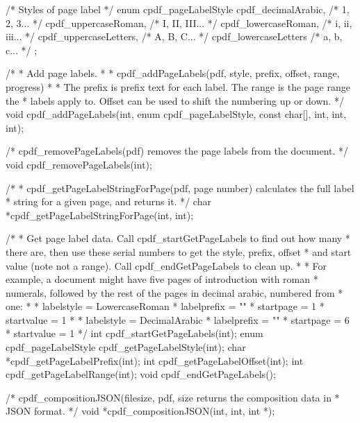 /* Styles of page label */
enum cpdf_pageLabelStyle {
  cpdf_decimalArabic,    /* 1, 2, 3... */
  cpdf_uppercaseRoman,   /* I, II, III... */
  cpdf_lowercaseRoman,   /* i, ii, iii... */
  cpdf_uppercaseLetters, /* A, B, C... */
  cpdf_lowercaseLetters  /* a, b, c... */
};

/*
 * Add page labels.
 *
 * cpdf_addPageLabels(pdf, style, prefix, offset, range, progress)
 *
 * The prefix is prefix text for each label. The range is the page range the
 * labels apply to. Offset can be used to shift the numbering up or down.
 */
void cpdf_addPageLabels(int, enum cpdf_pageLabelStyle, const char[], int, int,
                        int);

/* cpdf_removePageLabels(pdf) removes the page labels from the document. */
void cpdf_removePageLabels(int);

/*
 * cpdf_getPageLabelStringForPage(pdf, page number) calculates the full label
 * string for a given page, and returns it.
 */
char *cpdf_getPageLabelStringForPage(int, int);

/*
 * Get page label data. Call cpdf_startGetPageLabels to find out how many
 * there are, then use these serial numbers to get the style, prefix, offset
 * and start value (note not a range). Call cpdf_endGetPageLabels to clean up.
 *
 * For example, a document might have five pages of introduction with roman
 * numerals, followed by the rest of the pages in decimal arabic, numbered from
 * one:
 *
 * labelstyle = LowercaseRoman
 * labelprefix = ""
 * startpage = 1
 * startvalue = 1
 *
 * labelstyle = DecimalArabic
 * labelprefix = ""
 * startpage = 6
 * startvalue = 1
 */
int cpdf_startGetPageLabels(int);
enum cpdf_pageLabelStyle cpdf_getPageLabelStyle(int);
char *cpdf_getPageLabelPrefix(int);
int cpdf_getPageLabelOffset(int);
int cpdf_getPageLabelRange(int);
void cpdf_endGetPageLabels();

/* cpdf_compositionJSON(filesize, pdf, size returns the composition data in
 * JSON format. */
void *cpdf_compositionJSON(int, int, int *);

